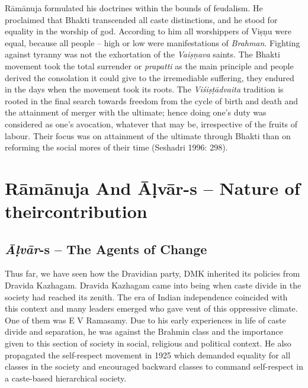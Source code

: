 Rāmānuja formulated his doctrines within the bounds of feudalism. He proclaimed that Bhakti transcended all caste distinctions, and he stood for equality in the worship of god. According to him all worshippers of Viṣṇu were equal, because all people – high or low were manifestations of \textit{Brahman}. Fighting against tyranny was not the exhortation of the \textit{Vaiṣņava} saints. The Bhakti movement took the total surrender or \textit{prapatti} as the main principle and people derived the consolation it could give to the irremediable suffering, they endured in the days when the movement took its roots. The \textit{Viśiṣṭādvaita} tradition is rooted in the final search towards freedom from the cycle of birth and death and the attainment of merger with the ultimate; hence doing one’s duty was considered as one’s avocation, whatever that may be, irrespective of the fruits of labour. Their focus was on attainment of the ultimate through Bhakti than on reforming the social mores of their time (Seshadri 1996: 298).


\section*{Rāmānuja And Āḷvār-s – Nature of their\hfill \break contribution}

\subsection*{\textit{Āḷvār}-s – The Agents of Change}

\vskip -6pt

Thus far, we have seen how the Dravidian party, DMK inherited its policies from Dravida Kazhagam. Dravida Kazhagam came into being when caste divide in the society had reached its zenith. The era of Indian independence coincided with this context and many leaders emerged who gave vent of this oppressive climate. One of them was E V Ramasamy. Due to his early experiences in life of caste divide and separation, he was against the Brahmin class and the importance given to this section of society in social, religious and political context. He also propagated the self-respect movement in 1925 which demanded equality for all classes in the society and encouraged backward classes to command self-respect in a caste-based hierarchical society.

